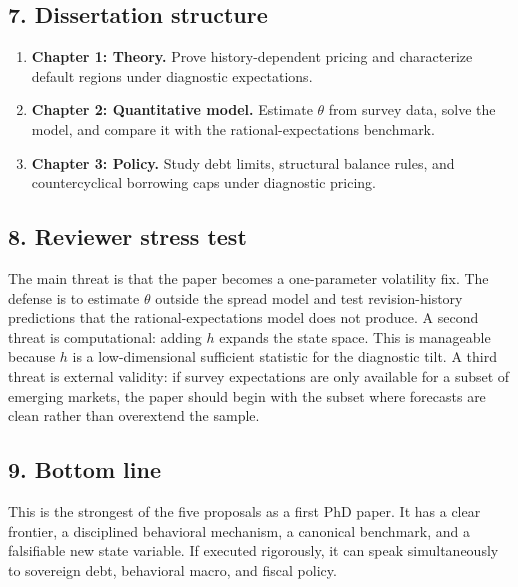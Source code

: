 \documentclass[11pt]{article}
\begin{document}
\subsection*{7. Dissertation structure}
\begin{enumerate}[leftmargin=*]
\item \textbf{Chapter 1: Theory.} Prove history-dependent pricing and characterize default regions under diagnostic expectations.
\item \textbf{Chapter 2: Quantitative model.} Estimate $\theta$ from survey data, solve the model, and compare it with the rational-expectations benchmark.
\item \textbf{Chapter 3: Policy.} Study debt limits, structural balance rules, and countercyclical borrowing caps under diagnostic pricing.
\end{enumerate}

\subsection*{8. Reviewer stress test}
The main threat is that the paper becomes a one-parameter volatility fix. The defense is to estimate $\theta$ outside the spread model and test revision-history predictions that the rational-expectations model does not produce. A second threat is computational: adding $h$ expands the state space. This is manageable because $h$ is a low-dimensional sufficient statistic for the diagnostic tilt. A third threat is external validity: if survey expectations are only available for a subset of emerging markets, the paper should begin with the subset where forecasts are clean rather than overextend the sample.

\subsection*{9. Bottom line}
This is the strongest of the five proposals as a first PhD paper. It has a clear frontier, a disciplined behavioral mechanism, a canonical benchmark, and a falsifiable new state variable. If executed rigorously, it can speak simultaneously to sovereign debt, behavioral macro, and fiscal policy.


\newpage
\printbibliography
\end{document}
